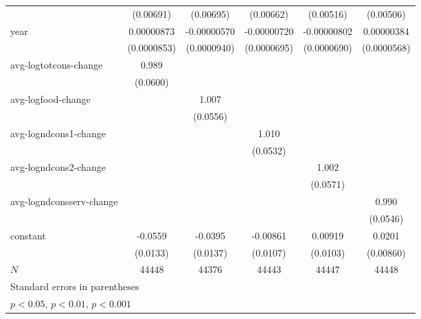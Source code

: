 \begin{table}[htbp]
\begin{tabular}{l*{5}{c}}
            &   (0.00691)         &   (0.00695)         &   (0.00662)         &   (0.00516)         &   (0.00506)         \\
year        &  0.00000873         & -0.00000570         & -0.00000720         & -0.00000802         &  0.00000384         \\
            & (0.0000853)         & (0.0000940)         & (0.0000695)         & (0.0000690)         & (0.0000568)         \\
avg-logtotcons-change&       0.989\sym{***}&                     &                     &                     &                     \\
            &    (0.0600)         &                     &                     &                     &                     \\
avg-logfood-change&                     &       1.007\sym{***}&                     &                     &                     \\
            &                     &    (0.0556)         &                     &                     &                     \\
avg-logndcons1-change&                     &                     &       1.010\sym{***}&                     &                     \\
            &                     &                     &    (0.0532)         &                     &                     \\
avg-logndcons2-change&                     &                     &                     &       1.002\sym{***}&                     \\
            &                     &                     &                     &    (0.0571)         &                     \\
avg-logndconsserv-change&                     &                     &                     &                     &       0.990\sym{***}\\
            &                     &                     &                     &                     &    (0.0546)         \\
constant    &     -0.0559\sym{***}&     -0.0395\sym{**} &    -0.00861         &     0.00919         &      0.0201\sym{*}  \\
            &    (0.0133)         &    (0.0137)         &    (0.0107)         &    (0.0103)         &   (0.00860)         \\
\hline
\(N\)       &       44448         &       44376         &       44443         &       44447         &       44448         \\
\hline\hline
\multicolumn{6}{l}{\footnotesize Standard errors in parentheses}\\
\multicolumn{6}{l}{\footnotesize \sym{*} \(p<0.05\), \sym{**} \(p<0.01\), \sym{***} \(p<0.001\)}\\
\end{tabular}
\end{table}
